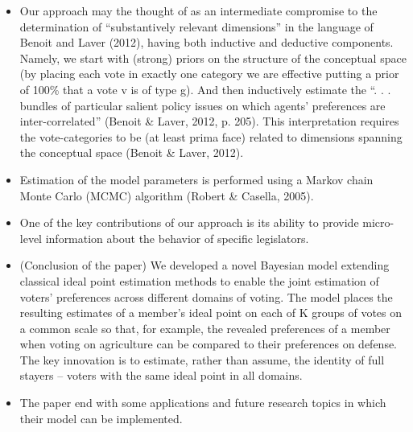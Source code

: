 \documentclass[a4paper,12pt]{article}
\begin{document}
\begin{enumerate}
\begin{itemize}
\item Our approach may the thought of as an intermediate compromise to the determination of “substantively relevant dimensions” in the language of Benoit and Laver (2012), having both inductive and deductive components. Namely, we start with (strong) priors on the structure of the conceptual space (by placing each vote in exactly one category we are effective putting a prior of 100\% that a vote v is of type g). And then inductively estimate the “. . . bundles of particular salient policy issues on which agents’ preferences are inter-correlated” (Benoit \& Laver, 2012, p. 205). This interpretation requires the vote-categories to be (at least prima face) related to dimensions spanning the conceptual space (Benoit \& Laver, 2012). 
\item Estimation of the model parameters is performed using a Markov chain Monte Carlo (MCMC) algorithm (Robert \& Casella, 2005). 
\item One of the key contributions of our approach is its ability to provide micro-level information about the behavior of specific legislators. 
\item (Conclusion of the paper) We developed a novel Bayesian model extending classical ideal point estimation methods to enable the joint estimation of voters’ preferences across different domains of voting. The model places the resulting estimates of a member’s ideal point on each of K groups of votes on a common scale so that, for example, the revealed preferences of a member when voting on agriculture can be compared to their preferences on defense. The key innovation is to estimate, rather than assume, the identity of full stayers – voters with the same ideal point in all domains. 
\item The paper end with some applications and future research topics in which their model can be implemented.  

\end{itemize}



\newpage





\end{enumerate}
\end{document}
